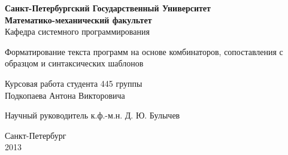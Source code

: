 \begin{titlepage}
\newpage

\begin{center}
	\textbf{
		Санкт-Петербургский Государственный Университет \\
		Математико-механический факультет \\
	}
	Кафедра системного программирования
\end{center}

\vspace{15em}

\begin{center}
\Large Форматирование текста программ на основе комбинаторов, сопоставления с образцом и синтаксических шаблонов \\ 
\end{center}

\vspace{2em}

\begin{center}
Курсовая работа студента 445 группы \\
Подкопаева Антона Викторовича

\end{center}

\vspace{10em}

Научный руководитель\dotfill
к.ф.-м.н. Д. Ю. Булычев


\vspace{\fill}

\begin{center}
Санкт-Петербург \\2013
\end{center}

\end{titlepage}